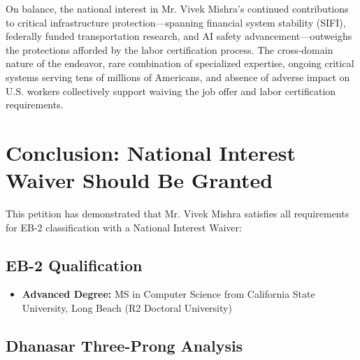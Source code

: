 \documentclass[11pt]{article}
\newcommand{\dr}{Mr. Vivek Mishra }
\newcommand{\drs}{Mr. Vivek Mishra's }
\begin{document}
On balance, the national interest in \drs continued contributions to critical infrastructure protection—spanning financial system stability (SIFI), federally funded transportation research, and AI safety advancement—outweighs the protections afforded by the labor certification process. The cross-domain nature of the endeavor, rare combination of specialized expertise, ongoing critical systems serving tens of millions of Americans, and absence of adverse impact on U.S. workers collectively support waiving the job offer and labor certification requirements.

\pagebreak


\section{Conclusion: National Interest Waiver Should Be Granted}
\label{sec:conclusion}

This petition has demonstrated that \dr satisfies all requirements for EB-2 classification with a National Interest Waiver:

\subsection{EB-2 Qualification}

\begin{itemize}
    \item[$\checkmark$] \textbf{Advanced Degree:} MS in Computer Science from California State University, Long Beach (R2 Doctoral University)
\end{itemize}

\subsection{Dhanasar Three-Prong Analysis}
\end{document}
